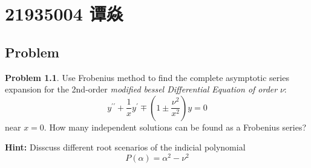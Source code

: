 \documentclass[a4paper]{book}
\makeatletter
\newcommand{\voidenvironment}[1]{%
  \expandafter\providecommand\csname env@#1@save@env\endcsname{}%
  \expandafter\providecommand\csname env@#1@process\endcsname{}%
  \@ifundefined{#1}{}{\RenewEnviron{#1}{}}%
}
\numberwithin{equation}{chapter}
\theoremstyle{definition}
\newtheorem{pro}[exm]{Problem}
\makeatother
\begin{document}
\pagestyle{empty}
% 



\setcounter{chapter}{0}




\chapter{21935004 谭焱}




\section{Problem}\label{sec:1}

\begin{pro}
  Use Frobenius method to find the complete asymptotic series expansion for the 2nd-order \textit{modified bessel Differential Equation of order} $\nu$:
  \[y^{\prime \prime} + \frac{1}{x} y^\prime \mp \left(1 \pm \frac{\nu^2}{x^2}\right)y = 0\]
  near $x = 0$. How many independent solutions can be found as a Frobenius series?

  \textbf{Hint:} Disscuss different root scenarios of the indicial polynomial
  \[P(\alpha) = \alpha^2 - \nu^2\]
\end{pro}
\end{document}
